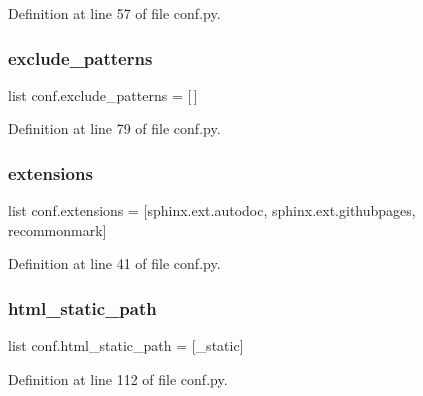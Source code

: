 Definition at line 57 of file conf.\+py.

\mbox{\label{namespaceconf_a7ad48fb6f3e9b129c02346ea0d3527c1}} 
\subsubsection{\texorpdfstring{exclude\+\_\+patterns}{exclude\_patterns}}
{\footnotesize\ttfamily list conf.\+exclude\+\_\+patterns = \mbox{[}$\,$\mbox{]}}



Definition at line 79 of file conf.\+py.

\mbox{\label{namespaceconf_ae475e080536acb271a0a0efe56c3ba42}} 
\subsubsection{\texorpdfstring{extensions}{extensions}}
{\footnotesize\ttfamily list conf.\+extensions = \mbox{[}\textquotesingle{}sphinx.\+ext.\+autodoc\textquotesingle{}, \textquotesingle{}sphinx.\+ext.\+githubpages\textquotesingle{}, \textquotesingle{}recommonmark\textquotesingle{}\mbox{]}}



Definition at line 41 of file conf.\+py.

\mbox{\label{namespaceconf_af4fb5d8851ccaade135c2668dd3ced41}} 
\subsubsection{\texorpdfstring{html\+\_\+static\+\_\+path}{html\_static\_path}}
{\footnotesize\ttfamily list conf.\+html\+\_\+static\+\_\+path = \mbox{[}\textquotesingle{}\+\_\+static\textquotesingle{}\mbox{]}}



Definition at line 112 of file conf.\+py.

\mbox{\label{namespaceconf_a5622a8722272baed29b41d8771ecbe3c}} 
